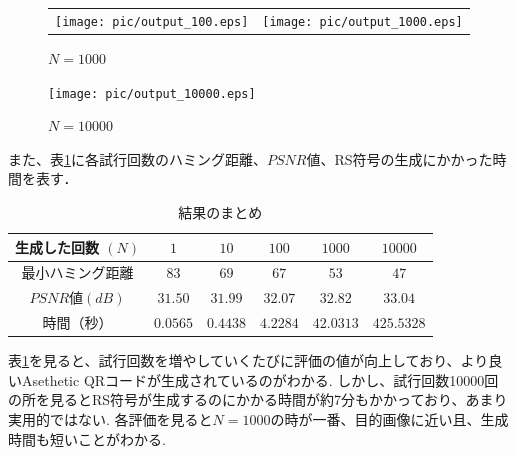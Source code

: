 \documentclass{thesis}
\begin{document}

\begin{figure}[H]
  \begin{tabular}{cc}
    \begin{minipage}[t]{0.45\hsize}
     \centering
      \texttt{[image: pic/output\_100.eps]}
      \caption{$N=100$}
      \label{fig:output_100}
    \end{minipage} &
    \begin{minipage}[t]{0.45\hsize}
     \centering
      \texttt{[image: pic/output\_1000.eps]}
       \caption{$N=1000$}
      \label{fig:output_1000}
      \end{minipage}
  \end{tabular}
\end{figure}


\begin{figure}[H]
      \centering
      \texttt{[image: pic/output\_10000.eps]}
       \caption{$N=10000$}
      \label{fig:output_10000}
    
\end{figure}

また、表\ref{summary}に各試行回数のハミング距離、$PSNR値$、RS符号の生成にかかった時間を表す．

\begin{table}[H]
	\caption{結果のまとめ}
	\begin{center}
  		\begin{tabular}{|c|c|c|c|c|c|} \hline
     			生成した回数 $(N) $&  $1$ & $10$ & $100$ & $1000$ & $10000$  \\  \hline
   			最小ハミング距離 &  $83$ & $69$ & $67$ & $53$ & $47$\\ \hline
			$PSNR$値$(dB)$ & $31.50$ & $31.99$ & $32.07$ & $32.82$ & $33.04$\\ \hline
			時間（秒） &  $0.0565$ & $0.4438$ & $4.2284$ & $42.0313$ & $425.5328$\\ \hline
     		\end{tabular}
  	\end{center}
  \label{summary}
\end{table}

表\ref{summary}を見ると、試行回数を増やしていくたびに評価の値が向上しており、より良いAsethetic QRコードが生成されているのがわかる.
しかし、試行回数10000回の所を見るとRS符号が生成するのにかかる時間が約7分もかかっており、あまり実用的ではない.
各評価を見ると$N=1000$の時が一番、目的画像に近い且、生成時間も短いことがわかる.
\end{document}
